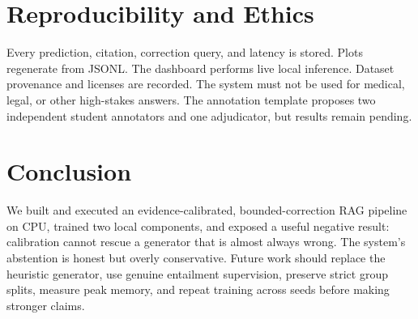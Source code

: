 \documentclass[conference]{IEEEtran}
\begin{document}
\section{Reproducibility and Ethics}Every prediction, citation, correction query, and latency is stored. Plots regenerate from JSONL. The dashboard performs live local inference. Dataset provenance and licenses are recorded. The system must not be used for medical, legal, or other high-stakes answers. The annotation template proposes two independent student annotators and one adjudicator, but results remain pending.
\section{Conclusion}We built and executed an evidence-calibrated, bounded-correction RAG pipeline on CPU, trained two local components, and exposed a useful negative result: calibration cannot rescue a generator that is almost always wrong. The system's abstention is honest but overly conservative. Future work should replace the heuristic generator, use genuine entailment supervision, preserve strict group splits, measure peak memory, and repeat training across seeds before making stronger claims.

\end{document}
